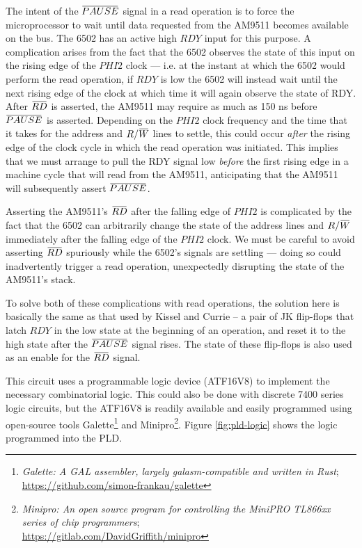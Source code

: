 \documentclass[11pt, letterpaper]{article}
\newcommand{\overbar}[1]{\mkern 1.5mu\overline{\mkern-1.5mu#1\mkern-1.5mu}\mkern 1.5mu}
\begin{document}
The intent of the $\overbar{PAUSE}$ signal in a read operation is to 
force the microprocessor to wait until data requested from the AM9511 
becomes available on the bus. The 6502 has an active high $RDY$ input 
for this purpose. A complication arises from the fact that the 6502 
observes the state of this input on the rising edge of the $PHI2$ 
clock --- i.e. at the instant at which the 6502 would perform the read 
operation, if $RDY$ is low the 6502 will instead wait until the next 
rising edge of the clock at which time it will again observe 
the state of RDY. After $\overbar{RD}$ is asserted, the AM9511 may 
require as much as 150 ns before $\overbar{PAUSE}$ is asserted. 
Depending on the $PHI2$ clock frequency and the time that it takes for 
the address and $R/\overbar{W}$ lines to settle, this could occur 
\emph{after} the rising edge of the clock cycle in which the read 
operation was initiated. This implies that we must arrange to pull the
RDY signal low \emph{before} the first rising edge in a machine cycle
that will read from the AM9511, anticipating that the AM9511 will
subsequently assert $\overbar{PAUSE}$.

Asserting the AM9511's $\overbar{RD}$ after the falling edge of $PHI2$ 
is complicated by the fact that the 6502 can arbitrarily change the 
state of the address lines and $R/\overbar{W}$ immediately after the 
falling edge of the $PHI2$ clock. We must be careful to avoid asserting 
$\overbar{RD}$ spuriously while the 6502's signals are settling --- 
doing so could inadvertently trigger a read operation, unexpectedly 
disrupting the state of the AM9511's stack.

To solve both of these complications with read operations, the solution
here is basically the same as that used by Kissel and Currie -- a pair 
of JK flip-flops that latch $RDY$ in the low state at the beginning of an
operation, and reset it to the high state after the $\overbar{PAUSE}$ 
signal rises. The state of these flip-flops is also used as an enable for 
the $\overbar{RD}$ signal.

This circuit uses a programmable logic device (ATF16V8) to implement the 
necessary combinatorial logic. This could also be done with discrete 7400 
series logic circuits, but the ATF16V8 is readily available and easily 
programmed using open-source tools Galette\footnote{\emph{Galette: A 
GAL assembler, largely galasm-compatible and written in Rust}; \\
\url{https://github.com/simon-frankau/galette}} 
and Minipro\footnote{\emph{Minipro: An open source program for controlling 
the MiniPRO TL866xx series of chip programmers}; \\
\url{https://gitlab.com/DavidGriffith/minipro}}. 
Figure 
\ref{fig:pld-logic} shows the logic programmed into the PLD.
\end{document}
